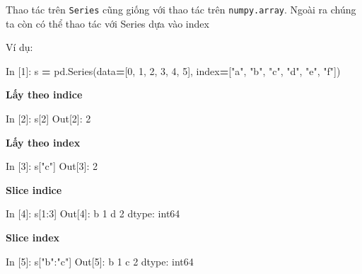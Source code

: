 \documentclass[
]{book}
\newenvironment{Shaded}{\begin{snugshade}}{\end{snugshade}}
\newcommand{\DecValTok}[1]{\textcolor[rgb]{0.00,0.00,0.81}{#1}}
\newcommand{\NormalTok}[1]{#1}
\newcommand{\OperatorTok}[1]{\textcolor[rgb]{0.81,0.36,0.00}{\textbf{#1}}}
\newcommand{\StringTok}[1]{\textcolor[rgb]{0.31,0.60,0.02}{#1}}
\begin{document}
Thao tác trên \texttt{Series} cũng giống với thao tác trên \texttt{numpy.array}. Ngoài ra chúng ta còn có thể thao tác với Series dựa vào index

Ví dụ:

\begin{Shaded}
\begin{Highlighting}[]
\NormalTok{In [}\DecValTok{1}\NormalTok{]: s }\OperatorTok{=}\NormalTok{ pd.Series(data}\OperatorTok{=}\NormalTok{[}\DecValTok{0}\NormalTok{, }\DecValTok{1}\NormalTok{, }\DecValTok{2}\NormalTok{, }\DecValTok{3}\NormalTok{, }\DecValTok{4}\NormalTok{, }\DecValTok{5}\NormalTok{], index}\OperatorTok{=}\NormalTok{[}\StringTok{"a"}\NormalTok{, }\StringTok{"b"}\NormalTok{, }\StringTok{"c"}\NormalTok{, }\StringTok{"d"}\NormalTok{, }\StringTok{"e"}\NormalTok{, }\StringTok{"f"}\NormalTok{])}
\end{Highlighting}
\end{Shaded}

\textbf{Lấy theo indice}

\begin{Shaded}
\begin{Highlighting}[]
\NormalTok{In [}\DecValTok{2}\NormalTok{]: s[}\DecValTok{2}\NormalTok{]}
\NormalTok{Out[}\DecValTok{2}\NormalTok{]: }\DecValTok{2}
\end{Highlighting}
\end{Shaded}

\textbf{Lấy theo index}

\begin{Shaded}
\begin{Highlighting}[]
\NormalTok{In [}\DecValTok{3}\NormalTok{]: s[}\StringTok{"c"}\NormalTok{]}
\NormalTok{Out[}\DecValTok{3}\NormalTok{]: }\DecValTok{2} 
\end{Highlighting}
\end{Shaded}

\textbf{Slice indice}

\begin{Shaded}
\begin{Highlighting}[]
\NormalTok{In [}\DecValTok{4}\NormalTok{]: s[}\DecValTok{1}\NormalTok{:}\DecValTok{3}\NormalTok{]}
\NormalTok{Out[}\DecValTok{4}\NormalTok{]:}
\NormalTok{b    }\DecValTok{1}
\NormalTok{d    }\DecValTok{2}
\NormalTok{dtype: int64}
\end{Highlighting}
\end{Shaded}

\textbf{Slice index}

\begin{Shaded}
\begin{Highlighting}[]
\NormalTok{In [}\DecValTok{5}\NormalTok{]: s[}\StringTok{"b"}\NormalTok{:}\StringTok{"c"}\NormalTok{]}
\NormalTok{Out[}\DecValTok{5}\NormalTok{]: }
\NormalTok{b    }\DecValTok{1}
\NormalTok{c    }\DecValTok{2}
\NormalTok{dtype: int64}
\end{Highlighting}
\end{Shaded}
\end{document}
